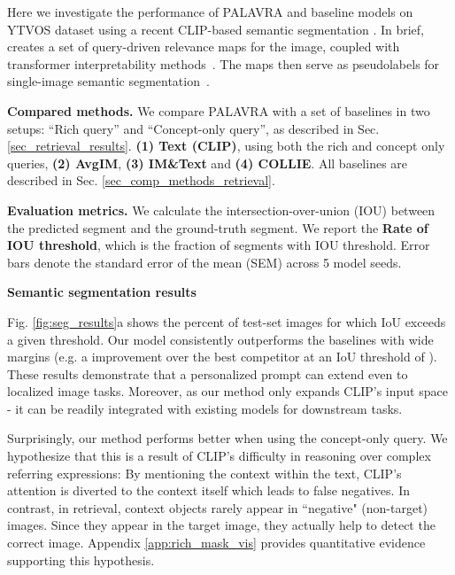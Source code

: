 \documentclass[runningheads]{llncs}
\newcommand{\secref}[1]{Sec. \ref{#1}}
\newcommand\edit[1]{#1}
\begin{document}
Here we investigate the performance of PALAVRA and baseline models on YTVOS dataset using a recent CLIP-based semantic segmentation  \cite{zabari2021semantic}. In brief,  \cite{zabari2021semantic} creates a set of query-driven relevance maps for the image, coupled with transformer interpretability methods~\cite{Chefer_2021_CVPR}.  The maps then serve as pseudolabels for single-image semantic segmentation~\cite{reviving2021}.
 
\noindent\textbf{Compared methods.}
\label{sec_comp_methods_sseg}
We compare PALAVRA with a set of baselines in two setups: ``Rich query'' and ``Concept-only query'', as described in  \secref{sec_retrieval_results}. 
\textbf{(1) Text (CLIP)}, using both the rich and concept only queries, \textbf{(2) AvgIM}, \textbf{(3) IM\&Text} and \textbf{ (4) COLLIE}. All baselines are described in \secref{sec_comp_methods_retrieval}. 

\noindent\textbf{Evaluation metrics.}
We calculate the intersection-over-union (IOU) between the predicted segment and the ground-truth segment. We report the \textbf{Rate of IOU  threshold}, which is the fraction of segments with IOU  threshold. Error bars denote the standard error of the mean (SEM) across 5 model seeds.



\noindent\textbf{Semantic segmentation results}

Fig. \ref{fig:seg_results}a shows the percent of test-set images for which IoU exceeds a given threshold. Our model consistently outperforms the baselines with wide margins (e.g. a  improvement over the best competitor at an IoU threshold of ).
These results demonstrate that a personalized prompt can extend even to localized image tasks. Moreover, as our method only expands CLIP's input space - it can be readily integrated with existing models for downstream tasks. 

Surprisingly, our method performs better when using the concept-only query. We hypothesize that this is a result of CLIP's difficulty in reasoning over complex referring expressions: By mentioning the context within the text, CLIP's attention is diverted to the context itself which leads to false negatives.  
\edit{In contrast, in retrieval, context  objects rarely appear in ``negative" (non-target) images. Since they appear in the target image, they actually help to detect the correct image. Appendix \ref{app:rich_mask_vis} provides quantitative evidence supporting this hypothesis.}
\end{document}
